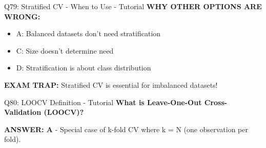 \documentclass[8pt]{beamer}
\begin{document}
\begin{frame}{Q79: Stratified CV - When to Use - Tutorial}
		\vspace{0.05cm}
		\textcolor{myred}{\textbf{WHY OTHER OPTIONS ARE WRONG:}}
		\begin{itemize}
			\item \textcolor{myred}{A:} Balanced datasets don't need stratification
			\item \textcolor{myred}{C:} Size doesn't determine need
			\item \textcolor{myred}{D:} Stratification is about class distribution
		\end{itemize}
		
		\textcolor{myred}{\textbf{EXAM TRAP:}} Stratified CV is essential for imbalanced datasets!
	\end{frame}
	
	\begin{frame}{Q80: LOOCV Definition - Tutorial}
		\fontsize{6.5}{7.5}\selectfont
		\textbf{What is Leave-One-Out Cross-Validation (LOOCV)?}
		
		\vspace{0.05cm}
		\textcolor{myblue}{\textbf{ANSWER: A}} - Special case of k-fold CV where k = N (one observation per fold).
		

\end{frame}
\end{document}
